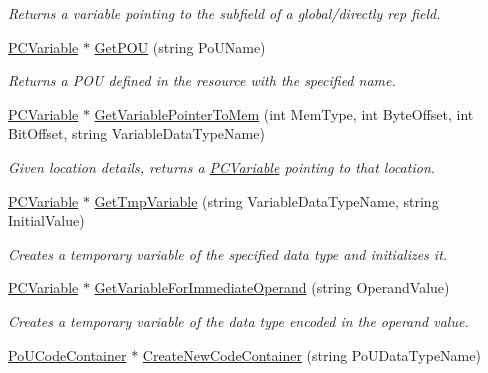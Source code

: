 \begin{DoxyCompactItemize}
\begin{DoxyCompactList}\small\item\em Returns a variable pointing to the subfield of a global/directly rep field. \end{DoxyCompactList}\item 
\hyperlink{classpc__emulator_1_1PCVariable}{P\+C\+Variable} $\ast$ \hyperlink{classpc__emulator_1_1PCResourceImpl_ad77764d5bda087274d6ab8a2bcf8c649}{Get\+P\+OU} (string Po\+U\+Name)
\begin{DoxyCompactList}\small\item\em Returns a P\+OU defined in the resource with the specified name. \end{DoxyCompactList}\item 
\hyperlink{classpc__emulator_1_1PCVariable}{P\+C\+Variable} $\ast$ \hyperlink{classpc__emulator_1_1PCResourceImpl_a0d071f95da611671930d5554c7c72e8b}{Get\+Variable\+Pointer\+To\+Mem} (int Mem\+Type, int Byte\+Offset, int Bit\+Offset, string Variable\+Data\+Type\+Name)
\begin{DoxyCompactList}\small\item\em Given location details, returns a \hyperlink{classpc__emulator_1_1PCVariable}{P\+C\+Variable} pointing to that location. \end{DoxyCompactList}\item 
\hyperlink{classpc__emulator_1_1PCVariable}{P\+C\+Variable} $\ast$ \hyperlink{classpc__emulator_1_1PCResourceImpl_ab55fc0e3ceb026fc93641f5feb0e2efc}{Get\+Tmp\+Variable} (string Variable\+Data\+Type\+Name, string Initial\+Value)
\begin{DoxyCompactList}\small\item\em Creates a temporary variable of the specified data type and initializes it. \end{DoxyCompactList}\item 
\hyperlink{classpc__emulator_1_1PCVariable}{P\+C\+Variable} $\ast$ \hyperlink{classpc__emulator_1_1PCResourceImpl_a698386af76ea94866178eda4e8bbefb9}{Get\+Variable\+For\+Immediate\+Operand} (string Operand\+Value)
\begin{DoxyCompactList}\small\item\em Creates a temporary variable of the data type encoded in the operand value. \end{DoxyCompactList}\item 
\hyperlink{classpc__emulator_1_1PoUCodeContainer}{Po\+U\+Code\+Container} $\ast$ \hyperlink{classpc__emulator_1_1PCResourceImpl_a9c043a5ecadb28a64148eafdc30c11b7}{Create\+New\+Code\+Container} (string Po\+U\+Data\+Type\+Name)\hypertarget{classpc__emulator_1_1PCResourceImpl_a9c043a5ecadb28a64148eafdc30c11b7}{}\label{classpc__emulator_1_1PCResourceImpl_a9c043a5ecadb28a64148eafdc30c11b7}


\end{DoxyCompactItemize}
